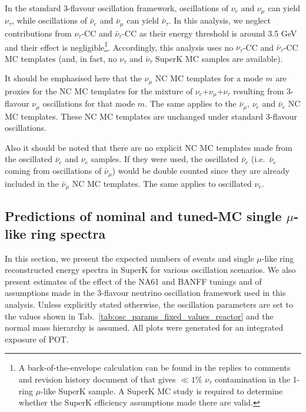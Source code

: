In the standard 3-flavour oscillation framework,
oscillations of $\nu_{e}$ and $\nu_{\mu}$ can yield $\nu_{\tau}$, while
oscillations of $\bar{\nu}_{e}$ and $\bar{\nu}_{\mu}$ can yield $\bar{\nu}_{\tau}$.
In this analysis, we neglect contributions from $\nu_{\tau}$-CC and $\bar{\nu}_{\tau}$-CC as their
energy threshold is around 3.5 GeV and their effect is negligible\footnote{
A back-of-the-envelope calculation can be found in the replies to
comments and revision history document of
\cite{OurRun123DisappAnalysis3Flavour} that gives $\ll 1\%$ $\nu_\tau$
contamination in the 1-ring $\mu$-like SuperK sample. A SuperK MC study is required
to determine whether the SuperK efficiency assumptions made there are valid.
  }.
Accordingly, this analysis uses no $\nu_{\tau}$-CC and $\bar{\nu}_{\tau}$-CC MC templates
(and, in fact, no $\nu_{\tau}$ and $\bar{\nu}_{\tau}$ SuperK MC samples are available).

It should be emphasised here that
the $\nu_{\mu}$ NC MC templates for a mode $m$ are proxies for the
NC MC templates for the mixture of $\nu_{e}$+$\nu_{\mu}$+$\nu_{\tau}$ resulting from
3-flavour $\nu_{\mu}$ oscillations for that mode $m$. The same applies to the $\bar{\nu}_{\mu}$, $\nu_{e}$ and $\bar{\nu}_{e}$ 
NC MC templates. These NC MC templates are unchanged under standard 3-flavour oscillations.%

Also it should be noted that there are no explicit NC MC templates made from the oscillated $\bar{\nu}_{e}$ and $\nu_{e}$ 
samples. If they were used, the oscillated $\bar{\nu}_{e}$ (i.e.\ $\bar{\nu}_{e}$ coming from oscillations of $\bar{\nu}_{\mu}$) 
would be double counted since they are already included in the $\bar{\nu}_{\mu}$ NC MC templates. The same applies to oscillated 
$\nu_{e}$.


\subsection {Predictions of nominal and tuned-MC single $\mu$-like ring spectra}
\label{sec:nominal_and_tuned_predictions}

In this section, we present the expected numbers of events and single $\mu$-like ring reconstructed energy spectra in SuperK 
for various oscillation scenarios. We also present estimates of the effect of the NA61 and BANFF tunings and of assumptions 
made in the 3-flavour neutrino oscillation framework used in this analysis. Unless explicitly stated otherwise, the oscillation 
parameters are set to the values shown in Tab.~\ref{tab:osc_params_fixed_values_reactor} and the normal mass hierarchy is assumed.
All plots were generated for an integrated exposure of \TotalPot POT.

